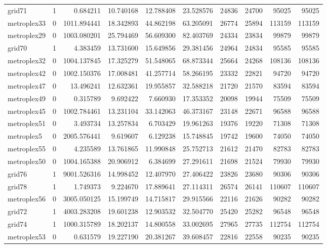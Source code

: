 \begin{longtable}{|l|r|r|r|r|r|r|r|r|r|}
grid71 & 1 & 0.684211 & 10.740168 & 12.788408 & 23.528576 & 24836 & 24700 & 95025 & 95025 \\
metroplex33 & 0 & 1011.894441 & 18.342893 & 44.862198 & 63.205091 & 26774 & 25894 & 113159 & 113159 \\
metroplex29 & 0 & 1003.080201 & 25.794469 & 56.609300 & 82.403769 & 24334 & 23834 & 99879 & 99879 \\
grid70 & 1 & 4.383459 & 13.731600 & 15.649856 & 29.381456 & 24964 & 24834 & 95585 & 95585 \\
metroplex32 & 0 & 1004.137845 & 17.325279 & 51.548065 & 68.873344 & 25664 & 24268 & 108136 & 108136 \\
metroplex42 & 0 & 1002.150376 & 17.008481 & 41.257714 & 58.266195 & 23332 & 22821 & 94720 & 94720 \\
metroplex47 & 0 & 13.496241 & 12.632361 & 19.955857 & 32.588218 & 21720 & 21570 & 83594 & 83594 \\
metroplex49 & 0 & 0.315789 & 9.692422 & 7.660930 & 17.353352 & 20098 & 19944 & 75509 & 75509 \\
metroplex45 & 0 & 1002.784461 & 13.231104 & 33.142063 & 46.373167 & 23148 & 22671 & 96588 & 96588 \\
metroplex51 & 0 & 3.493734 & 13.257834 & 6.703429 & 19.961263 & 19376 & 19220 & 71308 & 71308 \\
metroplex5 & 0 & 2005.576441 & 9.619607 & 6.129238 & 15.748845 & 19742 & 19600 & 74050 & 74050 \\
metroplex55 & 0 & 4.235589 & 13.761865 & 11.990848 & 25.752713 & 21612 & 21470 & 82783 & 82783 \\
metroplex50 & 0 & 1004.165388 & 20.906912 & 6.384699 & 27.291611 & 21698 & 21524 & 79930 & 79930 \\
grid76 & 1 & 9001.526316 & 14.998452 & 12.407970 & 27.406422 & 23826 & 23680 & 90306 & 90306 \\
grid78 & 1 & 1.749373 & 9.224670 & 17.889641 & 27.114311 & 26574 & 26141 & 110607 & 110607 \\
metroplex56 & 0 & 3005.050125 & 15.199749 & 14.715817 & 29.915566 & 22116 & 21626 & 90282 & 90282 \\
grid72 & 1 & 4003.283208 & 19.601238 & 12.903532 & 32.504770 & 25420 & 25282 & 96548 & 96548 \\
grid74 & 1 & 1000.315789 & 18.202137 & 14.800558 & 33.002695 & 27965 & 27735 & 112754 & 112754 \\
metroplex53 & 0 & 0.631579 & 19.227190 & 20.381267 & 39.608457 & 22816 & 22558 & 90235 & 90235 \\

\end{longtable}
